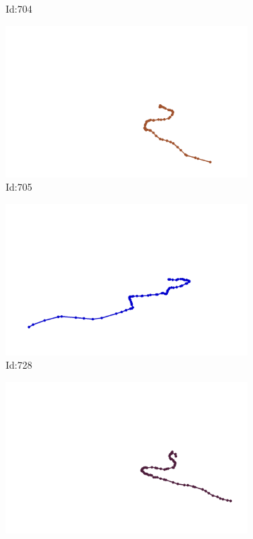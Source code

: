 \documentclass[12pt,twoside]{report}
\begin{document}
\begin{figure}
\begin{subfigure}[b]{0.20\textwidth}
\caption{Id:704}
\end{subfigure}
\begin{subfigure}[b]{0.20\textwidth}
\centering
\includegraphics[width=\textwidth]{../trajectories/705.png}
\caption{Id:705}
\end{subfigure}
\begin{subfigure}[b]{0.20\textwidth}
\centering
\includegraphics[width=\textwidth]{../trajectories/728.png}
\caption{Id:728}
\end{subfigure}
\begin{subfigure}[b]{0.20\textwidth}
\centering
\includegraphics[width=\textwidth]{../trajectories/767.png}

\end{subfigure}
\end{figure}
\end{document}
